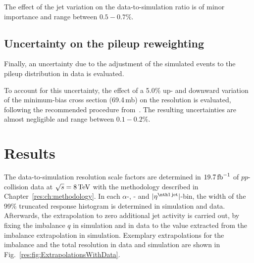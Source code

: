 The effect of the jet \pt variation on the data-to-simulation ratio is of minor importance and range between $0.5-0.7\%$.


\section*{Uncertainty on the pileup reweighting}
Finally, an uncertainty due to the adjustment of the simulated events to the pileup distribution in data is evaluated.

To account for this uncertainty, the effect of a 5.0\% up- and downward variation of the minimum-bias cross section (69.4\,mb) on the resolution is evaluated, following the recommended procedure from~\cite{bib:CMS:PileUpReweighting}.
The resulting uncertainties are almost negligible and range between $0.1-0.2\%$.

\FloatBarrier
\chapter{Results}
\label{res:ch:results}

The data-to-simulation resolution scale factors \rhores are determined in $19.7\,\text{fb}^{-1}$ of $pp$-collision data at $\sqrt{s} = 8 \,\text{Te}\kern-0.06667em\text{V}$ with the methodology described in Chapter~\ref{res:ch:methodology}.
In each $\alpha$-, \ptgamma- and $|\etafirstjet|$-bin, the width of the 99\% truncated response histogram is determined in simulation and data.
Afterwards, the extrapolation to zero additional jet activity is carried out, by fixing the imbalance $q$ in simulation and in data to the value extracted from the imbalance extrapolation in simulation.
Exemplary extrapolations for the imbalance and the total resolution in data and simulation are shown in Fig.~\ref{res:fig:ExtrapolationsWithData}.

